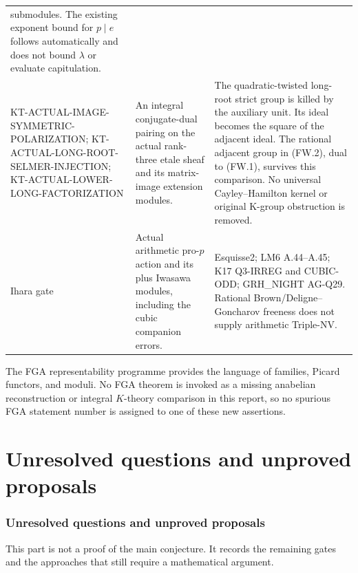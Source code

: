 \documentclass[11pt,a4paper]{article}
\theoremstyle{definition}
\begin{document}
\begin{longtable}{>{\raggedright\arraybackslash}p{}
>{\raggedright\arraybackslash}p{}
>{\raggedright\arraybackslash}p{}}
submodules. The existing exponent bound for $p\mid e$ follows
automatically and does not bound $\lambda$ or evaluate capitulation.\\
KT-ACTUAL-IMAGE-SYMMETRIC-POLARIZATION;
KT-ACTUAL-LONG-ROOT-SELMER-INJECTION;
KT-ACTUAL-LOWER-LONG-FACTORIZATION &
An integral conjugate-dual pairing on the actual rank-three
etale sheaf and its matrix-image extension modules. &
The quadratic-twisted long-root strict group is killed by
the auxiliary unit. Its ideal becomes the square of the
adjacent ideal. The rational adjacent group in (FW.2),
dual to (FW.1), survives this comparison. No universal
Cayley--Hamilton kernel or original K-group obstruction is removed.\\
Ihara gate &
Actual arithmetic pro-$p$ action and its plus Iwasawa modules,
including the cubic companion errors. &
Esquisse2; LM6 A.44--A.45; K17 Q3-IRREG and CUBIC-ODD;
GRH\_NIGHT AG-Q29. Rational Brown/Deligne--Goncharov
freeness does not supply arithmetic Triple-NV.\\
\bottomrule
\end{longtable}
\normalsize

The FGA representability programme provides the language of
families, Picard functors, and moduli. No FGA theorem is
invoked as a missing anabelian reconstruction or integral
$K$-theory comparison in this report, so no spurious FGA
statement number is assigned to one of these new assertions.


\part{Unresolved questions and unproved proposals}

\section{Unresolved questions and unproved proposals}

This part is not a proof of the main conjecture. It records the
remaining gates and the approaches that still require a
mathematical argument.
\end{document}
